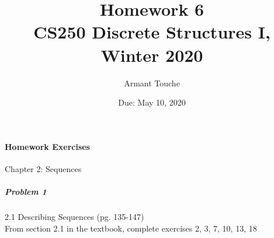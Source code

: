 \documentclass[11pt]{article} %
\title{\bf Homework 6\\[1ex]
\rm\normalsize CS250 Discrete Structures I, Winter 2020 }
\date{\normalsize Due: May 10, 2020}
\author{\normalsize Armant Touche}
\begin{document}

	\vspace{-4cm}\maketitle %
	
	\paragraph{Homework Exercises} Chapter 2: Sequences
	
	\subparagraph{Problem 1} 2.1 Describing Sequences (pg. 135-147)\\
			
		From section 2.1 in the textbook, complete exercises 2, 3, 7, 10, 13, 18
\end{document}
